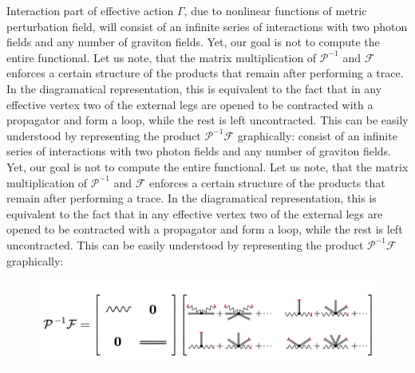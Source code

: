 \documentclass[11pt, a4paper]{article}
\begin{document}
Interaction part of effective action $\Gamma$, due to nonlinear functions of metric perturbation field, will
consist of an infinite series of interactions with two photon fields and any number of graviton fields. Yet, our goal is not to compute the entire functional.
Let us note, that the matrix multiplication of $\mathcal{P}^{-1}$ and $\mathcal{F}$ enforces a certain structure of the products that remain after performing a trace.
In the diagramatical representation, this is equivalent to the fact that in any effective vertex two of the external legs are opened to be contracted with a propagator and form a loop, while the rest is left uncontracted. This can be easily understood by representing the product $\mathcal{P}^{-1} \mathcal{F}$ graphically:
consist of an infinite series of interactions with two photon fields and any number of graviton fields. Yet, our goal is not to compute the entire functional.
Let us note, that the matrix multiplication of $\mathcal{P}^{-1}$ and $\mathcal{F}$ enforces a certain structure of the products that remain after performing a trace.
In the diagramatical representation, this is equivalent to the fact that in any effective vertex two of the external legs are opened to be contracted with a propagator and form a loop, while the rest is left uncontracted. This can be easily understood by representing the product $\mathcal{P}^{-1} \mathcal{F}$ graphically:
\begin{figure}[H]
    \includegraphics[width=1\textwidth]{./figures/drawing.png}
    \caption*{}
\end{figure}
\end{document}
